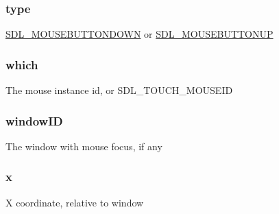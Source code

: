 \subsubsection[{\texorpdfstring{type}{type}}]{ type}\hypertarget{struct_s_d_l___mouse_button_event_aa40a9b05c3154032b9f2d7220e9f08dc}{}\label{struct_s_d_l___mouse_button_event_aa40a9b05c3154032b9f2d7220e9f08dc}
\hyperlink{_s_d_l__events_8h_a3b589e89be6b35c02e0dd34a55f3fccaa9267166e1536dfa8b0daa98c0afa9052}{S\+D\+L\+\_\+\+M\+O\+U\+S\+E\+B\+U\+T\+T\+O\+N\+D\+O\+WN} or \hyperlink{_s_d_l__events_8h_a3b589e89be6b35c02e0dd34a55f3fccaa4ab85278398d29b9e50f500aad2b952b}{S\+D\+L\+\_\+\+M\+O\+U\+S\+E\+B\+U\+T\+T\+O\+N\+UP} 
\subsubsection[{\texorpdfstring{which}{which}}]{ which}\hypertarget{struct_s_d_l___mouse_button_event_abd239700243abe3b42bfee05bbf65fa7}{}\label{struct_s_d_l___mouse_button_event_abd239700243abe3b42bfee05bbf65fa7}
The mouse instance id, or S\+D\+L\+\_\+\+T\+O\+U\+C\+H\+\_\+\+M\+O\+U\+S\+E\+ID 
\subsubsection[{\texorpdfstring{window\+ID}{windowID}}]{ window\+ID}\hypertarget{struct_s_d_l___mouse_button_event_a78d9995068d6f40cd78bb8db7351b0a1}{}\label{struct_s_d_l___mouse_button_event_a78d9995068d6f40cd78bb8db7351b0a1}
The window with mouse focus, if any 
\subsubsection[{\texorpdfstring{x}{x}}]{ x}\hypertarget{struct_s_d_l___mouse_button_event_a133a64253d58ecff038d427c70b5b0aa}{}\label{struct_s_d_l___mouse_button_event_a133a64253d58ecff038d427c70b5b0aa}
X coordinate, relative to window 

